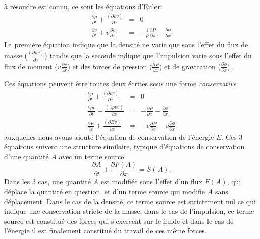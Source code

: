  à résoudre est connu, ce sont les équations d'Euler:
\begin{eqnarray}
\frac{\partial \rho}{\partial t}+\frac{(\partial \rho v)}{\partial x}&=&0\\
\frac{\partial v}{\partial t} + v \frac{\partial v}{\partial x}&=&-\frac{1}{\rho}\frac{\partial P}{\partial x}-\frac{\partial \phi}{\partial x}
\end{eqnarray}
La première équation indique que la densité ne varie que sous l'effet du flux de masse ($\frac{(\partial \rho v)}{\partial x}$) tandis que la seconde indique que l'impulsion varie sous l'effet du flux de moment ($ v \frac{\partial v}{\partial x}$) et des forces de pression ($\frac{\partial P}{\partial x}$)  et de gravitation ($\frac{\partial \phi}{\partial x}$) .

Ces équations peuvent être toutes deux écrites sous une forme \textit{conservative}
\begin{eqnarray}
\frac{\partial \rho}{\partial t}+\frac{(\partial \rho v)}{\partial x}&=&0\\
\frac{\partial \rho v}{\partial t}+\frac{(\partial \rho v v)}{\partial x}&=&-\frac{\partial P}{\partial x}-\frac{\partial \phi}{\partial x}\\
\frac{\partial E}{\partial t}+\frac{(\partial E v)}{\partial x}&=&-v \frac{\partial P}{\partial x}-v\frac{\partial \phi}{\partial x}
\end{eqnarray}
auxquelles nous avons ajouté l'équation de conservation de l'énergie $E$. Ces 3 équations suivent une structure similaire, typique d'équations de conservation d'une quantité $A$ avec un terme source
\begin{equation}
\frac{\partial A}{\partial t}+\frac{\partial F(A)}{\partial x}=S(A).
\label{e:cons}
\end{equation}
Dans les 3 cas, une quantité $A$ est modifiée sous l'effet d'un flux $F(A)$, qui déplace la quantité en question, et d'un terme source qui modifie $A$ sans déplacement. Dans le cas de la densité, ce terme source est strictement nul ce qui indique une conservation stricte de la masse, dans le cas de l'impulsion, ce terme source est constitué des forces qui s'exercent sur le fluide et dans le cas de l'énergie il est finalement constitué du travail de ces même forces.

